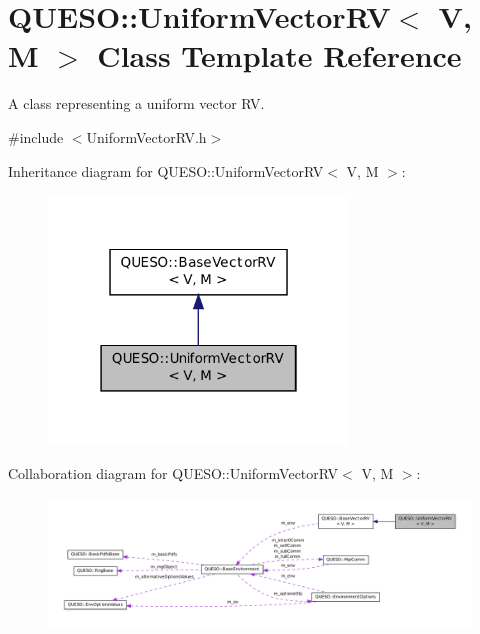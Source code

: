 \hypertarget{class_q_u_e_s_o_1_1_uniform_vector_r_v}{\section{Q\-U\-E\-S\-O\-:\-:Uniform\-Vector\-R\-V$<$ V, M $>$ Class Template Reference}
\label{class_q_u_e_s_o_1_1_uniform_vector_r_v}
}


A class representing a uniform vector R\-V.  




{\ttfamily \#include $<$Uniform\-Vector\-R\-V.\-h$>$}



Inheritance diagram for Q\-U\-E\-S\-O\-:\-:Uniform\-Vector\-R\-V$<$ V, M $>$\-:
\nopagebreak
\begin{figure}[H]
\begin{center}
\leavevmode
\includegraphics[width=226pt]{class_q_u_e_s_o_1_1_uniform_vector_r_v__inherit__graph}
\end{center}
\end{figure}


Collaboration diagram for Q\-U\-E\-S\-O\-:\-:Uniform\-Vector\-R\-V$<$ V, M $>$\-:
\nopagebreak
\begin{figure}[H]
\begin{center}
\leavevmode
\includegraphics[width=350pt]{class_q_u_e_s_o_1_1_uniform_vector_r_v__coll__graph}
\end{center}
\end{figure}
